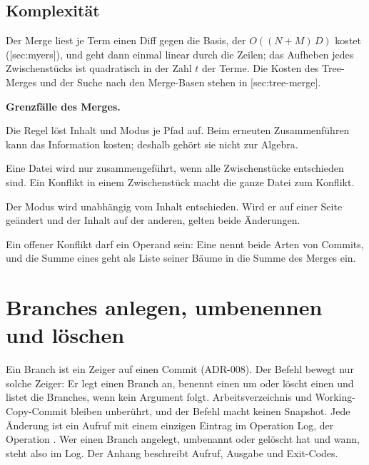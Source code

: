 \subsection{Komplexität}

Der Merge liest je Term einen Diff gegen die Basis, der $O((N+M)\,D)$ kostet
([sec:myers]), und geht dann einmal linear durch die Zeilen;
das Aufheben jedes Zwischenstücks ist quadratisch in der Zahl $t$ der Terme.
Die Kosten des Tree-Merges und der Suche nach den Merge-Basen stehen in
[sec:tree-merge].

\startinfobox
{\bf Grenzfälle des Merges.}
\startitemize
\item Die Regel  löst Inhalt und Modus je Pfad auf.
Beim erneuten Zusammenführen kann das Information kosten; deshalb gehört sie nicht zur Algebra.
\item Eine Datei wird nur zusammengeführt, wenn alle Zwischenstücke entschieden sind.
Ein Konflikt in einem Zwischenstück macht die ganze Datei zum Konflikt.
\item Der Modus wird unabhängig vom Inhalt entschieden. Wird er auf einer Seite geändert
und der Inhalt auf der anderen, gelten beide Änderungen.
\item Ein offener Konflikt darf ein Operand sein: Eine  nennt beide Arten von
Commits, und die Summe eines  geht als Liste seiner Bäume in die Summe des
Merges ein.
\stopitemize
\stopinfobox

\section[sec:branch-commands]{Branches anlegen, umbenennen und löschen}

Ein Branch ist ein Zeiger auf einen Commit (ADR-008). Der Befehl  bewegt nur solche
Zeiger: Er legt einen Branch an, benennt einen um oder löscht einen und listet die Branches, wenn
kein Argument folgt. Arbeitsverzeichnis und Working-Copy-Commit bleiben unberührt, und der Befehl
macht keinen Snapshot. Jede Änderung ist ein Aufruf mit einem einzigen Eintrag im Operation Log,
der Operation . Wer einen Branch angelegt, umbenannt oder gelöscht hat und wann,
steht also im Log. Der Anhang beschreibt Aufruf, Ausgabe und Exit-Codes.


